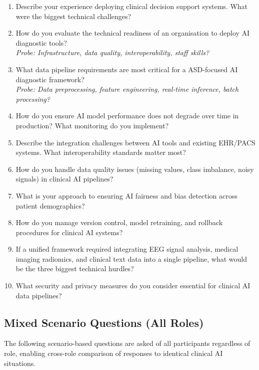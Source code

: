 \begin{enumerate}[label=\textbf{CI\arabic*.}, leftmargin=2cm]
    \item Describe your experience deploying clinical decision support systems. What were the biggest technical challenges?
    \item How do you evaluate the technical readiness of an organisation to deploy AI diagnostic tools? \\
    \textit{Probe: Infrastructure, data quality, interoperability, staff skills?}
    \item What data pipeline requirements are most critical for a ASD-focused AI diagnostic framework? \\
    \textit{Probe: Data preprocessing, feature engineering, real-time inference, batch processing?}
    \item How do you ensure AI model performance does not degrade over time in production? What monitoring do you implement?
    \item Describe the integration challenges between AI tools and existing EHR/PACS systems. What interoperability standards matter most?
    \item How do you handle data quality issues (missing values, class imbalance, noisy signals) in clinical AI pipelines?
    \item What is your approach to ensuring AI fairness and bias detection across patient demographics?
    \item How do you manage version control, model retraining, and rollback procedures for clinical AI systems?
    \item If a unified framework required integrating EEG signal analysis, medical imaging radiomics, and clinical text data into a single pipeline, what would be the three biggest technical hurdles?
    \item What security and privacy measures do you consider essential for clinical AI data pipelines?
\end{enumerate}

\subsection{Mixed Scenario Questions (All Roles)}

The following scenario-based questions are asked of all participants regardless of role, enabling cross-role comparison of responses to identical clinical AI situations.

